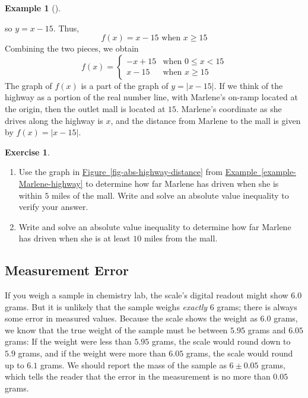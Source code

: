 \documentclass[10pt,]{book}
\theoremstyle{plain}
\theoremstyle{definition}
\theoremstyle{definition}
\theoremstyle{definition}
\newtheorem{example}[theorem]{Example}
\theoremstyle{definition}
\theoremstyle{definition}
\newtheorem{exercise}[theorem]{Exercise}
\numberwithin{equation}{section}
\newcommand\abs[1]{\left|#1\right|}
\newcommand{\lt}{ < }
\newcommand{\amp}{ & }
\begin{document}
\begin{example}[]
\begin{enumerate}[label=*\alph**]
        so \(y = x − 15\). Thus,
        \begin{equation*}f (x) = x − 15 \text{ when }  x \ge 15\end{equation*}
        Combining the two pieces, we obtain
        \begin{equation*}
        f (x) =
        \begin{cases}
        −x + 15 \amp \text{when } 0\le x\lt 15\\
        x − 15  \amp \text{when } x\ge 15
        \end{cases}
        \end{equation*}
        The graph of \(f (x)\) is a part of the graph of \(y = \abs{x − 15}\). If we think of the highway as a portion of the real number line, with Marlene’s on-ramp located at the origin, then the outlet mall is located at \(15\). Marlene's coordinate as she drives along the highway is \(x\), and the distance from Marlene to the mall is given by \(f (x) = \abs{x − 15}\).
    \end{enumerate}
\end{example}
\begin{exercise}\label{exercise-Marlene-highway}
\leavevmode%
\begin{enumerate}[label=*\alph**]
\item\hypertarget{li-367}{}Use the graph in \hyperref[fig-abs-highway-distance]{Figure~\ref{fig-abs-highway-distance}} from \hyperref[example-Marlene-highway]{Example~\ref{example-Marlene-highway}} to determine how far Marlene has driven when she is within \(5\) miles of the mall. Write and solve an absolute value inequality to verify your answer.\item\hypertarget{li-368}{}Write and solve an absolute value inequality to determine how far Marlene has driven when she is at least \(10\) miles from the mall.\end{enumerate}
\end{exercise}
\typeout{************************************************}
\typeout{************************************************}
\subsection[Measurement Error]{Measurement Error}\label{subsection-51}

    If you weigh a sample in chemistry lab, the scale’s digital readout might show \(6.0\) grams. But it is unlikely that the sample weighs \emph{exactly} \(6\) grams; there is always some error in measured values. Because the scale shows the weight as \(6.0\) grams, we know that the true weight of the sample must be between \(5.95\) grams and \(6.05\) grams: If the weight were less than \(5.95\) grams, the scale would round down to \(5.9\) grams, and if the weight were more than \(6.05\) grams, the scale would round up to \(6.1\) grams. We should report the mass of the sample as \(6 \pm 0.05\) grams, which tells the reader that the error in the measurement is no more than \(0.05\) grams. 
%
\par
\end{document}
